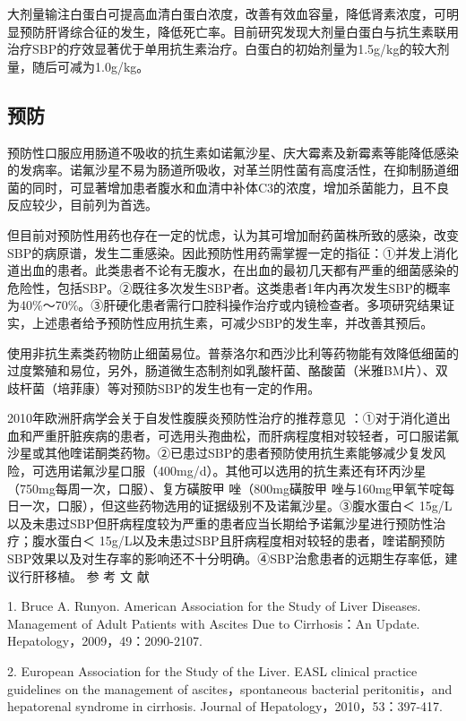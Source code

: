大剂量输注白蛋白可提高血清白蛋白浓度，改善有效血容量，降低肾素浓度，可明显预防肝肾综合征的发生，降低死亡率。目前研究发现大剂量白蛋白与抗生素联用治疗SBP的疗效显著优于单用抗生素治疗。白蛋白的初始剂量为1.5g/kg的较大剂量，随后可减为1.0g/kg。

\subsection{预防}

预防性口服应用肠道不吸收的抗生素如诺氟沙星、庆大霉素及新霉素等能降低感染的发病率。诺氟沙星不易为肠道所吸收，对革兰阴性菌有高度活性，在抑制肠道细菌的同时，可显著增加患者腹水和血清中补体C3的浓度，增加杀菌能力，且不良反应较少，目前列为首选。

但目前对预防性用药也存在一定的忧虑，认为其可增加耐药菌株所致的感染，改变SBP的病原谱，发生二重感染。因此预防性用药需掌握一定的指征：①并发上消化道出血的患者。此类患者不论有无腹水，在出血的最初几天都有严重的细菌感染的危险性，包括SBP。②既往多次发生SBP者。这类患者1年内再次发生SBP的概率为40\%～70\%。③肝硬化患者需行口腔科操作治疗或内镜检查者。多项研究结果证实，上述患者给予预防性应用抗生素，可减少SBP的发生率，并改善其预后。

使用非抗生素类药物防止细菌易位。普萘洛尔和西沙比利等药物能有效降低细菌的过度繁殖和易位，另外，肠道微生态制剂如乳酸杆菌、酪酸菌（米雅BM片）、双歧杆菌（培菲康）等对预防SBP的发生也有一定的作用。

2010年欧洲肝病学会关于自发性腹膜炎预防性治疗的推荐意见
：①对于消化道出血和严重肝脏疾病的患者，可选用头孢曲松，而肝病程度相对较轻者，可口服诺氟沙星或其他喹诺酮类药物。②已患过SBP的患者预防使用抗生素能够减少复发风险，可选用诺氟沙星口服（400mg/d）。其他可以选用的抗生素还有环丙沙星（750mg每周一次，口服）、复方磺胺甲{}
唑（800mg磺胺甲{}
唑与160mg甲氧苄啶每日一次，口服），但这些药物选用的证据级别不及诺氟沙星。③腹水蛋白＜
15g/L以及未患过SBP但肝病程度较为严重的患者应当长期给予诺氟沙星进行预防性治疗；腹水蛋白＜
15g/L以及未患过SBP且肝病程度相对较轻的患者，喹诺酮预防SBP效果以及对生存率的影响还不十分明确。④SBP治愈患者的远期生存率低，建议行肝移植。\hypertarget{text00329.htmlux5cux23CHP11-7-2-5}{}
参 考 文 献

1. Bruce A. Runyon. American Association for the Study of Liver
Diseases. Management of Adult Patients with Ascites Due to Cirrhosis：An
Update. Hepatology，2009，49：2090-2107.

2. European Association for the Study of the Liver. EASL clinical
practice guidelines on the management of ascites，spontaneous bacterial
peritonitis，and hepatorenal syndrome in cirrhosis. Journal of
Hepatology，2010，53：397-417.

